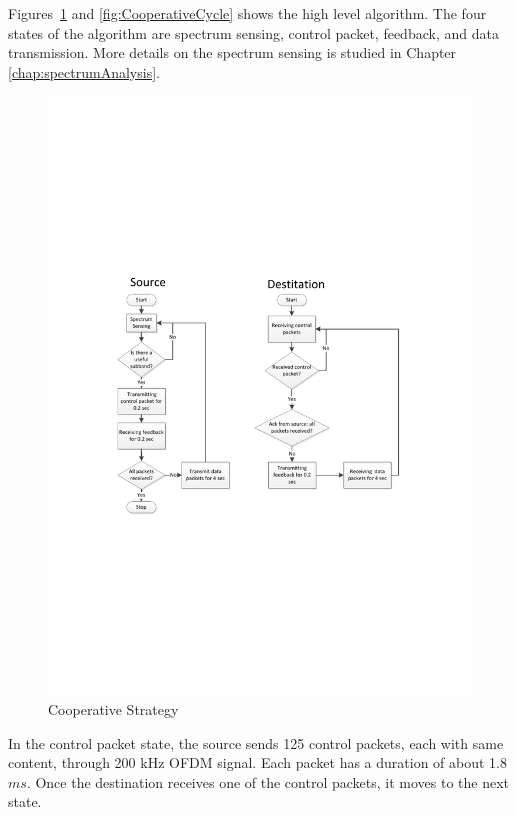 Figures~\ref{fig:CooperativeStrategy} and \ref{fig:CooperativeCycle} shows the high level algorithm. The four states of the algorithm are spectrum sensing, control packet, feedback, and data transmission. More details on the spectrum sensing is studied in Chapter \ref{chap:spectrumAnalysis}.

\begin{figure}[tpb]
  \begin{center}
    \centerline{\includegraphics[width=160mm]{CooperativeStrategy.pdf}}
    \caption{Cooperative Strategy}
    \label{fig:CooperativeStrategy}
  \end{center}
\end{figure}

In the control packet state, the source sends 125 control packets, each with same content, through 200 kHz OFDM signal. Each packet has a duration of about 1.8 $ms$. Once the destination receives one of the control packets, it moves to the next state.


